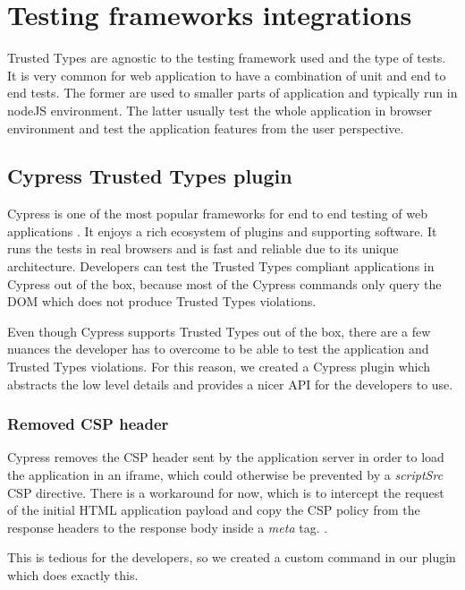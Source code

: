 \chapter{Testing frameworks integrations}


Trusted Types are agnostic to the testing framework used and the type of tests. It is very common
for web application to have a combination of unit and end to end tests. The former are used to
smaller parts of application and typically run in nodeJS environment. The latter usually test the
whole application in browser environment and test the application features from the user
perspective.

\section{Cypress Trusted Types plugin}
\label{cypress_testing_plugin}

Cypress is one of the most popular frameworks for end to end testing of web applications
\cite{js_state:testing}. It enjoys a rich ecosystem of plugins and supporting software. It runs the
tests in real browsers and is fast and reliable due to its unique architecture. Developers can test
the Trusted Types compliant applications in Cypress out of the box, because most of the Cypress
commands only query the DOM which does not produce Trusted Types violations.

Even though Cypress supports Trusted Types out of the box, there are a few
nuances the developer has to overcome to be able to test the application and Trusted Types
violations. For this reason, we created a Cypress plugin which abstracts the low level details
and provides a nicer API for the developers to use.

\subsection{Removed CSP header}

Cypress removes the CSP header sent by the application server in order to load the application in an
iframe, which could otherwise be prevented by a \textit{scriptSrc} CSP directive. There is a
workaround for now, which is to intercept the request of the initial HTML application payload and
copy the CSP policy from the response headers to the response body inside a \textit{meta} tag.
\cite{cypress:csp_removal_issue}.

This is tedious for the developers, so we created a custom command in our plugin which does
exactly this.

